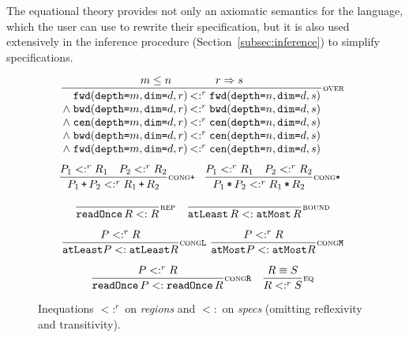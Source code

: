 \documentclass[9pt]{sigplanconf}
\theoremstyle{definition}
\newcommand{\term}[1]{\texttt{#1}}
\newcommand{\stenFwdSR}[3]{\term{fwd} (\term{depth=}#1,
  \term{dim=}#2, #3)}
\newcommand{\stenBwdSR}[3]{\term{bwd} (\term{depth=}#1,
  \term{dim=}#2, #3)}
\newcommand{\stenCenSR}[3]{\term{cen} (\term{depth=}#1,
  \term{dim=}#2, #3)}
\newcommand{\trule}[1]{{\footnotesize{#1}}}
\begin{document}
The equational theory provides not only an axiomatic semantics
for the language, which the user can use to rewrite their
specification, but it is also used extensively in the inference
procedure (Section~\ref{subsec:inference}) to simplify specifications.

\begin{figure}[t]
\begin{align*}
\hspace{-0.5em}
\begin{array}{c}
%
\vspace{-0.4em}
\setlength{\arraycolsep}{0.1em}
\dfrac{\hspace{3em} m \leq n \qquad\qquad r \Rightarrow s \hspace{3em}}
{\begin{array}{rl}
\stenFwdSR{m}{d}{r} & <:^r \stenFwdSR{n}{d}{s}
\\
\wedge \; \stenBwdSR{m}{d}{r} & <:^r \stenBwdSR{n}{d}{s}
\\
\wedge \; \stenCenSR{m}{d}{r} & <:^r \stenCenSR{n}{d}{s}
\\
\wedge \; \stenBwdSR{m}{d}{r} & <:^r \stenCenSR{n}{d}{s} \\
\wedge \; \stenFwdSR{m}{d}{r} & <:^r \stenCenSR{n}{d}{s} \\[1.2em]
\end{array}}\trule{\textsc{over}} \\
\hspace{-0.5em}
\dfrac{P_1 <:^r R_1 \quad P_2 <:^r R_2}
      {P_1 \, \texttt{+} \, P_2 <:^r R_1 \, \texttt{+} \, R_2}
\trule{\textsc{cong}\texttt{+}} \;\;\;
\dfrac{P_1 <:^r R_1 \quad P_2 <:^r R_2}
      {P_1 \, \texttt{*} \, P_2 <:^r R_1 \, \texttt{*} \, R_2}
\trule{\textsc{cong}\texttt{*}} \\[1.5em]
%
\dfrac{}{\term{readOnce} \, R <: R}\trule{\textsc{rep}}
\quad
\dfrac{}{\term{atLeast} \, R <: \term{atMost} \,
  R}\trule{\textsc{bound}} \\[1.5em]
\dfrac{P <:^r R}{\term{atLeast}  P <: \term{atLeast} 
  R}\trule{\textsc{cong}\texttt{L}}
\ 
\dfrac{P <:^r R}{\term{atMost}  P <: \term{atMost} 
  R}\trule{\textsc{cong}\texttt{M}} \\[1.5em]
\dfrac{P <:^r R}{\term{readOnce} \, P <: \term{readOnce} \,
  R}\trule{\textsc{cong}\texttt{R}} 
\quad
\dfrac{R \equiv S}{R <:^r S}\trule{\textsc{eq}} 
\end{array}
\end{align*}
\caption{Inequations $<:^r$ on \textit{regions} and
$<:$ on \textit{specs} (omitting reflexivity
and transitivity). }
\label{fig:inequations}
\vspace{-0.8em}
\end{figure}
\end{document}
